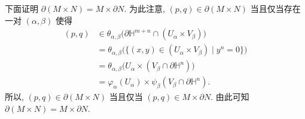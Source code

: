 \begin{description}[font=\normalfont,leftmargin=2em,labelwidth=1.5em]
下面证明 $\partial(M\times N)=M\times\partial N$. 为此注意, $(p,q)\in\partial(M\times N)$ 当且仅当存在一对 $(\alpha,\beta)$ 使得
\begin{align*}
  (p,q)&\in\theta_{\alpha,\beta}\bigl(\partial\mathbb{H}^{m+n}\cap(U_\alpha\times V_\beta)\bigr)\\
       &=\theta_{\alpha,\beta}\bigl(\{(x,y)\in(U_\alpha\times V_\beta)\mid y^n=0\}\bigr)\\
       &=\theta_{\alpha,\beta}\bigl(U_\alpha\times(V_\beta\cap\partial\mathbb{H}^n)\bigr)\\
       &=\varphi_\alpha(U_\alpha)\times\psi_\beta(V_\beta\cap\partial\mathbb{H}^n).
\end{align*}
所以, $(p,q)\in\partial(M\times N)$ 当且仅当 $(p,q)\in M\times\partial N$. 由此可知 $\partial(M\times N)=M\times\partial N$.
\end{description}
